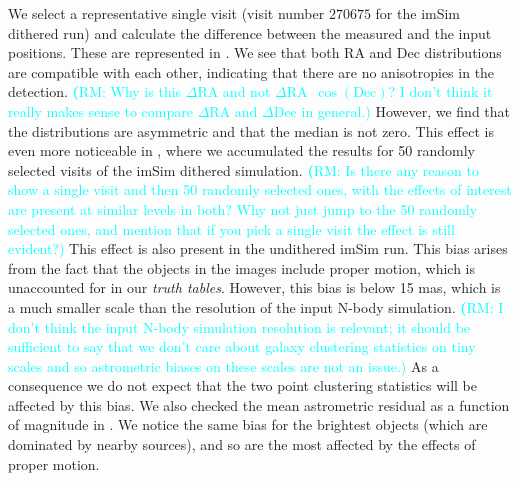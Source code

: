 \documentclass[twocolumn]{aastex62}
\newcommand{\rachel}[1]{{\textcolor{cyan}{{\textbf (RM: #1)}}}}
\begin{document}
We select a representative single visit (visit number $270675$ for the imSim dithered run) and calculate the difference between the measured and the input positions. These are represented in . We see that both RA and Dec distributions are compatible with each other, indicating that there are no anisotropies in the detection. \rachel{Why is this $\Delta$RA and not $\Delta$RA~$\cos{(\text{Dec})}$?  I don't think it really makes sense to compare $\Delta$RA and $\Delta$Dec in general.}
However, we find that the distributions are asymmetric and that the median is not zero. This effect is even more noticeable in , where we accumulated the results for 50 randomly selected visits of the imSim dithered simulation. \rachel{Is there any reason to show a single visit and then 50 randomly selected ones, with the effects of interest are present at similar levels in both?  Why not just jump to the 50 randomly selected ones, and mention that if you pick a single visit the effect is still evident?} This effect is also present in the undithered imSim run. This bias arises from the fact that the objects in the images include proper motion, which is unaccounted for in our \textit{truth tables}. However, this bias is below 15 mas, which is a much smaller scale than the resolution of the input N-body simulation. \rachel{I don't think the input N-body simulation resolution is relevant; it should be sufficient to say that we don't care about galaxy clustering statistics on tiny scales and so astrometric biases on these scales are not an issue.} As a consequence we do not expect that the two point clustering statistics will be affected by this bias. We also checked the mean astrometric residual as a function of magnitude in . We notice the same bias for the brightest objects (which are dominated by nearby sources), and so are the most affected by the effects of proper motion.
\end{document}
